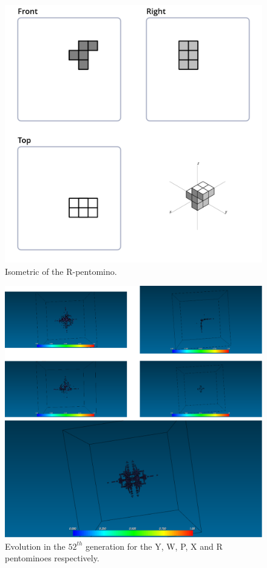 \begin{figure}
	\centering
	\includegraphics[scale=0.3]{iso_diagrams/r.png}
	\caption{Isometric of the R-pentomino.}
  \label{fig:iso-pent-r}
\end{figure}

\begin{figure}
	\centering
	\includegraphics[scale=0.4]{pentominoes_ss/r-comparative-70g.png}
	\caption{Evolution in the $52^{th}$ generation for the Y, W, P, X and R
	pentominoes respectively.}
  \label{fig:ss-pent:r-comparative}
\end{figure}

